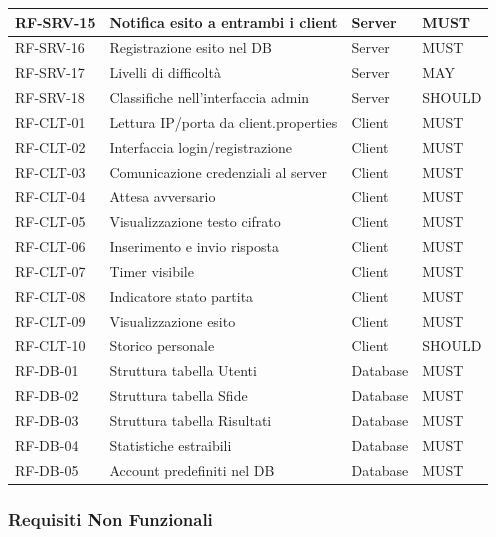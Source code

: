 \documentclass[12pt, a4paper]{article}
\begin{document}
\begin{longtable}{|p{2.5cm}|p{7cm}|p{2cm}|p{1.5cm}|}
    \hline
    RF-SRV-15 & Notifica esito a entrambi i client & Server & MUST \\
    \hline
    RF-SRV-16 & Registrazione esito nel DB & Server & MUST \\
    \hline
    RF-SRV-17 & Livelli di difficoltà & Server & MAY \\
    \hline
    RF-SRV-18 & Classifiche nell'interfaccia admin & Server & SHOULD \\
    \hline
    RF-CLT-01 & Lettura IP/porta da client.properties & Client & MUST \\
    \hline
    RF-CLT-02 & Interfaccia login/registrazione & Client & MUST \\
    \hline
    RF-CLT-03 & Comunicazione credenziali al server & Client & MUST \\
    \hline
    RF-CLT-04 & Attesa avversario & Client & MUST \\
    \hline
    RF-CLT-05 & Visualizzazione testo cifrato & Client & MUST \\
    \hline
    RF-CLT-06 & Inserimento e invio risposta & Client & MUST \\
    \hline
    RF-CLT-07 & Timer visibile & Client & MUST \\
    \hline
    RF-CLT-08 & Indicatore stato partita & Client & MUST \\
    \hline
    RF-CLT-09 & Visualizzazione esito & Client & MUST \\
    \hline
    RF-CLT-10 & Storico personale & Client & SHOULD \\
    \hline
    RF-DB-01 & Struttura tabella Utenti & Database & MUST \\
    \hline
    RF-DB-02 & Struttura tabella Sfide & Database & MUST \\
    \hline
    RF-DB-03 & Struttura tabella Risultati & Database & MUST \\
    \hline
    RF-DB-04 & Statistiche estraibili & Database & MUST \\
    \hline
    RF-DB-05 & Account predefiniti nel DB & Database & MUST \\
    \hline
\end{longtable}

\subsubsection{Requisiti Non Funzionali}
\end{document}
